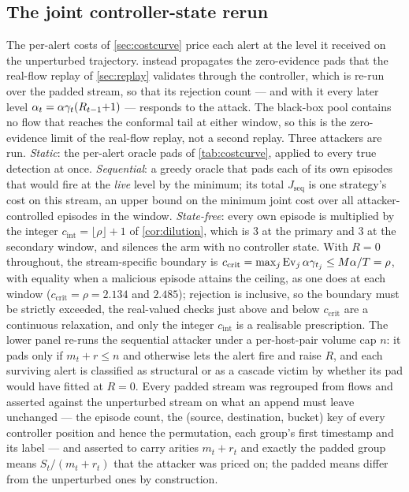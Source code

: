 \subsection{The joint controller-state rerun}\label{app:joint}

The per-alert costs of \cref{sec:costcurve} price each alert at the level it received on the
unperturbed trajectory.  instead propagates the zero-evidence pads that the
real-flow replay of \cref{sec:replay} validates through the controller, which is re-run over the
padded stream, so that its rejection count --- and with it every later level
$\alpha_t=\alpha\gamma_t(R_{t-1}{+}1)$ --- responds to the attack. The black-box pool contains no flow
that reaches the conformal tail at either window, so this is the zero-evidence limit of the real-flow
replay, not a second replay. Three attackers are run. \emph{Static}: the per-alert oracle pads of
\cref{tab:costcurve}, applied to every true detection at once. \emph{Sequential}: a greedy oracle
that pads each of its own episodes that would fire at the \emph{live} level by the minimum; its total
$J_{\mathrm{seq}}$ is one strategy's cost on this stream, an upper bound on the minimum joint cost
over all attacker-controlled episodes in the window. \emph{State-free}: every own episode is
multiplied by the integer $c_{\mathrm{int}}=\lfloor\rho\rfloor+1$ of \cref{cor:dilution}, which is
$3$ at the primary and $3$ at the secondary
window, and silences the arm with no controller state. With $R=0$ throughout, the stream-specific
boundary is $c_{\mathrm{crit}}=\max_j \mathrm{Ev}_j\,\alpha\gamma_{t_j}\le M\alpha/T=\rho$, with equality
when a malicious episode attains the ceiling, as one does at each window ($c_{\mathrm{crit}}=\rho=2.134$
and $2.485$); rejection is inclusive, so the boundary must be strictly
exceeded, the real-valued checks just above and below $c_{\mathrm{crit}}$ are a continuous relaxation,
and only the integer $c_{\mathrm{int}}$ is a realisable prescription. The lower panel re-runs the sequential attacker under a per-host-pair volume cap $n$:
it pads only if $m_t+r\le n$ and otherwise lets the alert fire and raise $R$, and each surviving alert
is classified as structural or as a cascade victim by whether its pad would have fitted at $R=0$.
Every padded stream was regrouped from flows and asserted against the unperturbed stream on what an
append must leave unchanged --- the episode count, the (source, destination, bucket) key of every
controller position and hence the permutation, each group's first timestamp and its label --- and
asserted to carry arities $m_t+r_t$ and exactly the padded group means $S_t/(m_t+r_t)$ that the
attacker was priced on; the padded means differ from the unperturbed ones by construction.
